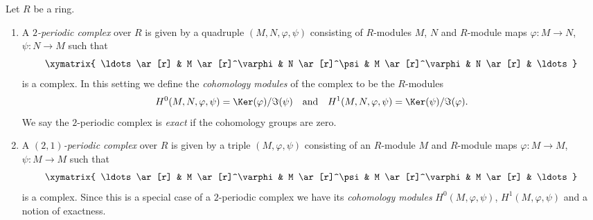 \begin{definition}
\label{definition-periodic-complex}
Let $R$ be a ring.
\begin{enumerate}
\item A {\it $2$-periodic complex} over $R$ is given
by a quadruple $(M, N, \varphi, \psi)$ consisting of
$R$-modules $M$, $N$ and $R$-module maps $\varphi : M \to N$,
$\psi : N \to M$ such that
$$
\xymatrix{
\ldots \ar[r] &
M \ar[r]^\varphi &
N \ar[r]^\psi &
M \ar[r]^\varphi &
N \ar[r] & \ldots
}
$$
is a complex. In this setting we define the {\it cohomology modules}
of the complex to be the $R$-modules
$$
H^0(M, N, \varphi, \psi) = \Ker(\varphi)/\Im(\psi)
\quad\text{and}\quad
H^1(M, N, \varphi, \psi) = \Ker(\psi)/\Im(\varphi).
$$
We say the $2$-periodic complex is {\it exact} if the cohomology
groups are zero.
\item A {\it $(2, 1)$-periodic complex} over $R$ is given
by a triple $(M, \varphi, \psi)$ consisting of an $R$-module $M$ and
$R$-module maps $\varphi : M \to M$, $\psi : M \to M$
such that
$$
\xymatrix{
\ldots \ar[r] &
M \ar[r]^\varphi &
M \ar[r]^\psi &
M \ar[r]^\varphi &
M \ar[r] & \ldots
}
$$
is a complex. Since this is a special case of a $2$-periodic complex
we have its {\it cohomology modules} $H^0(M, \varphi, \psi)$,
$H^1(M, \varphi, \psi)$ and a notion of exactness.
\end{enumerate}
\end{definition}